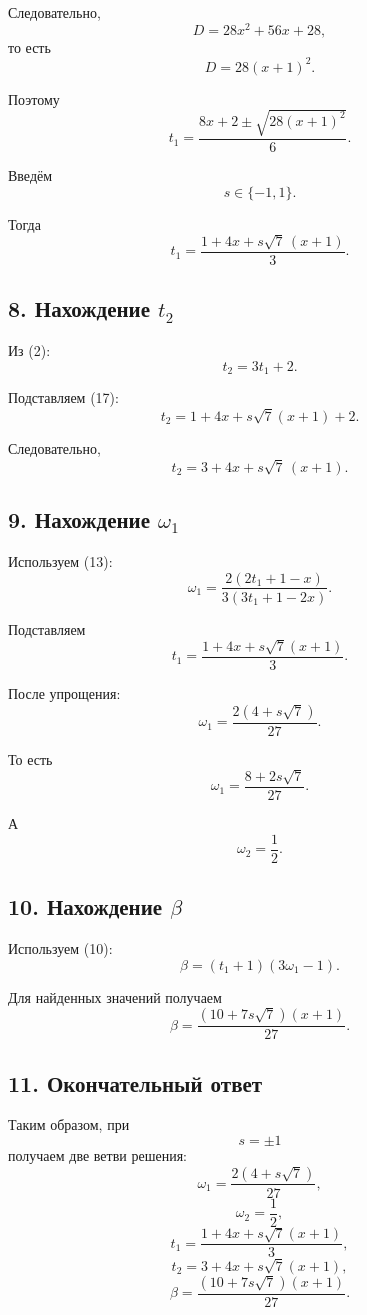 \documentclass[12pt,a4paper]{article}
\begin{document}
	Следовательно,
	\[
	D=28x^2+56x+28,
	\]
	то есть
	\[
	\boxed{D=28(x+1)^2}.
	\tag{16}
	\]
	
	Поэтому
	\[
	t_1
	=
	\frac{8x+2\pm\sqrt{28(x+1)^2}}{6}.
	\]
	
	Введём
	\[
	s\in\{-1,1\}.
	\]
	
	Тогда
	\[
	\boxed{
		t_1=
		\frac{1+4x+s\sqrt{7}\,(x+1)}{3}
	}.
	\tag{17}
	\]
	
	\subsection*{8. Нахождение $t_2$}
	
	Из (2):
	\[
	t_2=3t_1+2.
	\]
	
	Подставляем (17):
	\[
	t_2
	=
	1+4x+s\sqrt{7}(x+1)+2.
	\]
	
	Следовательно,
	\[
	\boxed{
		t_2=3+4x+s\sqrt{7}\,(x+1)
	}.
	\tag{18}
	\]
	
	\subsection*{9. Нахождение $\omega_1$}
	
	Используем (13):
	\[
	\omega_1=
	\frac{2(2t_1+1-x)}
	{3(3t_1+1-2x)}.
	\]
	
	Подставляем
	\[
	t_1=
	\frac{1+4x+s\sqrt{7}(x+1)}{3}.
	\]
	
	После упрощения:
	\[
	\boxed{
		\omega_1=
		\frac{2(4+s\sqrt{7})}{27}
	}.
	\tag{19}
	\]
	
	То есть
	\[
	\boxed{
		\omega_1=\frac{8+2s\sqrt{7}}{27}
	}.
	\]
	
	А
	\[
	\boxed{\omega_2=\frac12}.
	\tag{20}
	\]
	
	\subsection*{10. Нахождение $\beta$}
	
	Используем (10):
	\[
	\beta=(t_1+1)(3\omega_1-1).
	\]
	
	Для найденных значений получаем
	\[
	\boxed{
		\beta=
		\frac{(10+7s\sqrt{7})(x+1)}{27}
	}.
	\tag{21}
	\]
	
	\subsection*{11. Окончательный ответ}
	
	Таким образом, при
	\[
	s=\pm1
	\]
	получаем две ветви решения:
	\[
	\boxed{
		\omega_1=
		\frac{2(4+s\sqrt{7})}{27}
	},
	\]
	\[
	\boxed{
		\omega_2=\frac12
	},
	\]
	\[
	\boxed{
		t_1=
		\frac{1+4x+s\sqrt{7}(x+1)}{3}
	},
	\]
	\[
	\boxed{
		t_2=
		3+4x+s\sqrt{7}(x+1)
	},
	\]
	\[
	\boxed{
		\beta=
		\frac{(10+7s\sqrt{7})(x+1)}{27}
	}.
	\]
	
\end{document}

